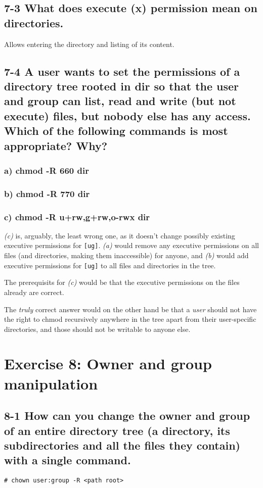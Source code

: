 \subsection{7-3 What does execute (x) permission mean on directories.}
Allows entering the directory and listing of its content.

\subsection{7-4 A user wants to set the permissions of a directory tree rooted in dir so that the user and group can list, read and write (but not execute) files, but nobody else has any access. Which of the following commands is most appropriate? Why?}

\subsubsection{a) chmod -R 660 dir}

\subsubsection{b) chmod -R 770 dir}

\subsubsection{c) chmod -R u+rw,g+rw,o-rwx dir}

\emph{(c)} is, arguably, the least wrong one, as it doesn't change possibly existing executive permissions for \verb=[ug]=. \emph{(a)} would remove any executive permissions on all files (and directories, making them inaccessible) for anyone, and \emph{(b)} would add executive permissions for \verb=[ug]= to all files and directories in the tree.

The prerequisits for \emph{(c)} would be that the executive permissions on the files already are correct.

The \emph{truly} correct answer would on the other hand be that a \emph{user} should not have the right to chmod recursively anywhere in the tree apart from their user-specific directories, and those should not be writable to anyone else.


\section{Exercise 8: Owner and group manipulation}
\subsection{8-1 How can you change the owner and group of an entire directory tree (a directory, its subdirectories and all the files they contain) with a single command.}
\verb=# chown user:group -R <path root>=

